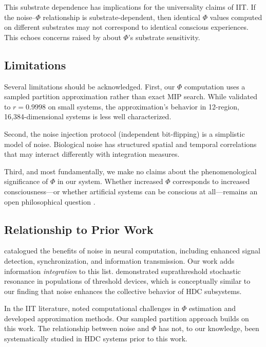 \documentclass[12pt,a4paper]{article}
\begin{document}
This substrate dependence has implications for the universality claims of IIT. If the noise--$\Phi$ relationship is substrate-dependent, then identical $\Phi$ values computed on different substrates may not correspond to identical conscious experiences. This echoes concerns raised by \citet{aaronson2014phi} about $\Phi$'s substrate sensitivity.

\subsection{Limitations}

Several limitations should be acknowledged. First, our $\Phi$ computation uses a sampled partition approximation rather than exact MIP search. While validated to $r = 0.9998$ on small systems, the approximation's behavior in 12-region, 16,384-dimensional systems is less well characterized.

Second, the noise injection protocol (independent bit-flipping) is a simplistic model of noise. Biological noise has structured spatial and temporal correlations \citep{faisal2008noise} that may interact differently with integration measures.

Third, and most fundamentally, we make no claims about the phenomenological significance of $\Phi$ in our system. Whether increased $\Phi$ corresponds to increased consciousness---or whether artificial systems can be conscious at all---remains an open philosophical question \citep{chalmers2010character, tononi2015integrated}.

\subsection{Relationship to Prior Work}

\citet{mcdonnell2011benefits} catalogued the benefits of noise in neural computation, including enhanced signal detection, synchronization, and information transmission. Our work adds information \emph{integration} to this list. \citet{stocks2000suprathreshold} demonstrated suprathreshold stochastic resonance in populations of threshold devices, which is conceptually similar to our finding that noise enhances the collective behavior of HDC subsystems.

In the IIT literature, \citet{barrett2011practical} noted computational challenges in $\Phi$ estimation and developed approximation methods. Our sampled partition approach builds on this work. The relationship between noise and $\Phi$ has not, to our knowledge, been systematically studied in HDC systems prior to this work.
\end{document}
